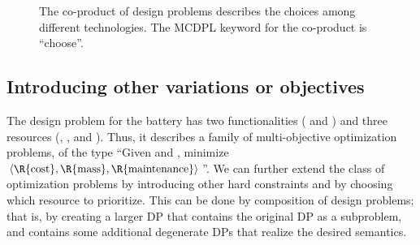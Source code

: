 \begin{figure}[h]

\smallskip{}

\caption{\label{fig:batteriesbig}The co-product of design problems describes
the choices among different technologies. The MCDPL keyword for the
co-product is ``choose''.}
\end{figure}


\subsection{Introducing other variations or objectives}

The design problem for the battery has two functionalities (
and ) and three resources (, ,
and ). Thus, it describes a family of multi-objective
optimization problems, of the type ``Given  and ,
minimize $\left\langle \R{\text{cost}},\R{\text{mass}},\R{\text{maintenance}}\right\rangle $''.
We can further extend the class of optimization problems by introducing
other hard constraints and by choosing which resource to prioritize.
This can be done by composition of design problems; that is, by creating
a larger DP that contains the original DP as a subproblem, and contains
some additional degenerate DPs that realize the desired semantics.

